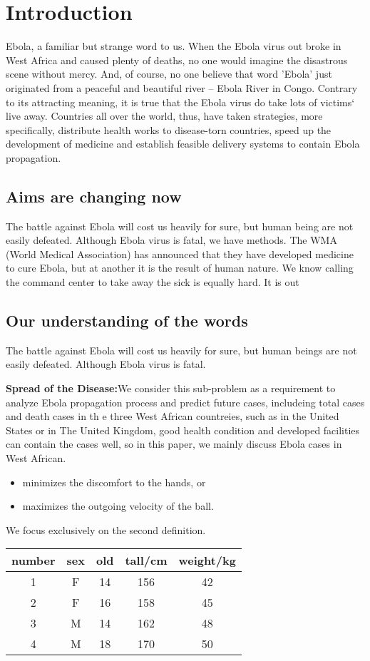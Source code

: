 \documentclass{mcmthesis}
\begin{document}
\section{Introduction}
Ebola, a familiar but strange word to us. When the Ebola virus out broke in West Africa and caused plenty of deaths, no one
would imagine the disastrous scene without mercy. And, of course, no one believe that word 'Ebola' just originated from a peaceful and 
beautiful river -- Ebola River in Congo. Contrary to its attracting meaning, it is true that the Ebola virus do take lots of victims`
live away. Countries all over the world, thus, have taken strategies, more specifically, distribute health works to disease-torn countries, speed up
the development of medicine and establish feasible delivery systems to contain Ebola propagation. 
\subsection{Aims are changing now}
The battle against Ebola will cost us heavily for sure, but human being are not
easily defeated. Although Ebola virus is fatal, we have methods. The WMA (World Medical Association) has announced that
 they have developed medicine to cure Ebola, but at another it is the result of human nature. We know calling the command
center to take away the sick is equally hard. It is out \cite{5}
\subsection{Our understanding of the words}
The battle against Ebola will cost us heavily for sure, but human beings are not easily defeated. Although Ebola virus is
fatal.

\textbf{Spread of the Disease:}We consider this sub-problem as a requirement to analyze Ebola propagation process and predict
future cases, includeing total cases and death cases in th e three West African countreies, such as in the United States or in The
United Kingdom, good health condition and developed facilities can contain the cases well, so in this paper, we mainly discuss Ebola
cases in West African. 
\begin{itemize}
\item minimizes the discomfort to the hands, or
\item maximizes the outgoing velocity of the ball.
\end{itemize}
We focus exclusively on the second definition.

\begin{center}
\begin{tabular}{ccccc}
  \toprule
  number & sex & old & tall/cm & weight/kg \\
  \midrule
  1 & F & 14 & 156 & 42 \\
  2 & F & 16 & 158 & 45 \\
  3 & M & 14 & 162 & 48 \\
  4 & M & 18 & 170 & 50 \\
  \bottomrule
\end{tabular}
\end{center}
\end{document}
